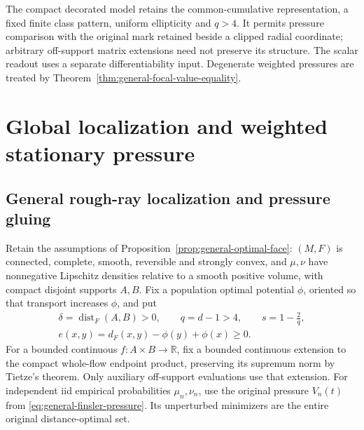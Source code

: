 \documentclass[11pt,reqno]{amsart}
\theoremstyle{definition}
\theoremstyle{remark}
\numberwithin{equation}{section}
\newcommand{\R}{\mathbb R}
\begin{document}
The compact decorated model retains the common-cumulative representation,
a fixed finite class pattern, uniform ellipticity and \(q>4\).
It permits pressure comparison with the original mark retained beside a
clipped radial coordinate; arbitrary off-support matrix extensions need
not preserve its structure. The scalar readout uses a separate
differentiability input. Degenerate weighted pressures are treated by
Theorem~\ref{thm:general-focal-value-equality}.


\section{Global localization and weighted stationary pressure}\label{sec:global-weighted-pressure}

\subsection{General rough-ray localization and pressure gluing}
\label{general-gluing-section}

Retain the assumptions of Proposition~\ref{prop:general-optimal-face}:
\((M,F)\) is connected, complete, smooth, reversible and strongly convex,
and \(\mu,\nu\) have nonnegative Lipschitz densities relative to a smooth
positive volume, with compact disjoint supports \(A,B\). Fix a population
optimal potential \(\phi\), oriented so that transport increases \(\phi\),
and put
\[
 \begin{gathered}
 \delta=\operatorname{dist}_F(A,B)>0,\qquad
 q=d-1>4,\qquad s=1-\frac2q,\\
 e(x,y)=d_F(x,y)-\phi(y)+\phi(x)\ge0.
 \end{gathered}
\]
For a bounded continuous \(f:A\times B\to\R\), fix a bounded continuous
extension to the compact whole-flow endpoint product, preserving its
supremum norm by Tietze's theorem. Only auxiliary off-support evaluations
use that extension. For independent iid empirical probabilities
\(\mu_n,\nu_n\), use the original pressure \(V_n(t)\) from
\eqref{eq:general-finsler-pressure}. Its unperturbed minimizers
are the entire original distance-optimal set.
\end{document}
